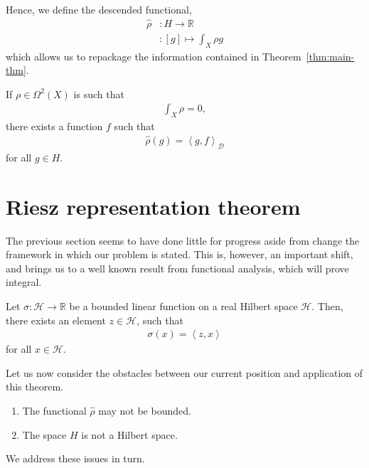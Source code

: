 Hence, we define the descended functional,
\begin{align*}
	\hat{\rho} & : H \to \mathbb{R}                          \\
	           & : \left[ g \right] \mapsto \int_{X}{\rho g}
\end{align*}
which allows us to repackage the information contained in
Theorem~\ref{thm:main-thm}.

\addtocounter{definition}{-5}
\begin{theorem}
	If $ \rho \in \Omega^2(X) $ is such that
	\begin{align*}
		\int_{X}{\rho} = 0,
	\end{align*}
	there exists a function $ f $ such that
	\begin{align*}
		\hat{\rho}(g) = \left\langle g,f \right\rangle _{\mathcal{D}}
	\end{align*}
	for all $ g \in H $.
\end{theorem}
\addtocounter{definition}{4}

\section{Riesz representation theorem}\label{sec:riesz}
The previous section seems to have done little for progress aside from change
the framework in which our problem is stated. This is, however, an important
shift, and brings us to a well known result from functional analysis, which will
prove integral.

\begin{theorem}\label{thm:riesz}
	Let $ \sigma: \mathcal{H}\to \mathbb{R} $ be a bounded linear function on a
	real Hilbert space $ \mathcal{H} $. Then, there exists an element $ z \in
		\mathcal{H} $, such that
	\begin{align*}
		\sigma(x) = \left\langle z,x \right\rangle
	\end{align*}
	for all $ x \in \mathcal{H} $.
\end{theorem}

Let us now consider the obstacles between our current position and application
of this theorem.
\begin{enumerate}
	\item The functional $ \hat{\rho} $ may not be bounded.
	\item The space $ H $ is not a Hilbert space.
\end{enumerate}

We address these issues in turn.

